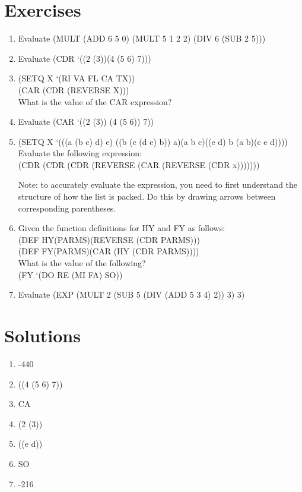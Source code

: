 \documentclass[10pt]{article}
\begin{document}
\section{Exercises}
\begin{enumerate}
    \item Evaluate (MULT (ADD 6 5 0) (MULT 5 1 2 2) (DIV 6 (SUB 2 5)))
    \item Evaluate (CDR `((2 (3))(4 (5 6) 7)))
    \item (SETQ X `(RI VA FL CA TX))\\
    (CAR (CDR (REVERSE X)))\\
    What is the value of the CAR expression?
    \item Evaluate (CAR `((2 (3)) (4 (5 6)) 7))
    \item (SETQ X `(((a (b c) d) e) ((b (c (d e) b)) a)(a b c)((e d) b (a b)(c e d))))\\
    Evaluate the following expression:\\
    (CDR (CDR (CDR (REVERSE (CAR (REVERSE (CDR x)))))))

    Note: to accurately evaluate the expression,
    you need to first understand the structure
    of how the list is packed.
    Do this by drawing arrows between corresponding parentheses.

    \item Given the function definitions for HY and FY as follows:\\
    (DEF HY(PARMS)(REVERSE (CDR PARMS)))\\
    (DEF FY(PARMS)(CAR (HY (CDR PARMS))))\\
    What is the value of the following?\\
    (FY `(DO RE (MI FA) SO))
    \item Evaluate
    (EXP (MULT 2 (SUB 5 (DIV (ADD 5 3 4) 2)) 3) 3)
\end{enumerate}

\newpage
\section{Solutions}
\begin{enumerate}
    \item -440
    \item ((4 (5 6) 7))
    \item CA
    \item (2 (3))
    \item ((e d))
    \item SO
    \item -216
\end{enumerate}

\end{document}
